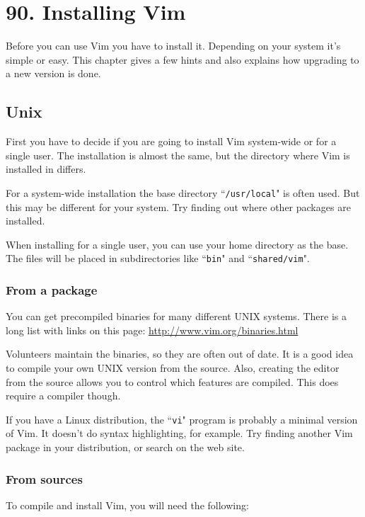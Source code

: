 \section{90. Installing Vim}
\label{Installing Vim}
\label{install}
Before you can use Vim you have to install it.
Depending on your system it's simple or easy.
This chapter gives a few hints and also explains how upgrading to a new version is done.
\localtableofcontents
\subsection{Unix}
First you have to decide if you are going to install Vim system-wide or for a single user.
The installation is almost the same, but the directory where Vim is installed in differs.

For a system-wide installation the base directory ``\texttt{/usr/local}" is often used.
But this may be different for your system.
Try finding out where other packages are installed.

When installing for a single user, you can use your home directory as the base.
The files will be placed in subdirectories like ``\texttt{bin}" and ``\texttt{shared/vim}".

\subsubsection{From a package}
You can get precompiled binaries for many different UNIX systems.
There is a long list with links on this page: \url{http://www.vim.org/binaries.html}

Volunteers maintain the binaries, so they are often out of date.
It is a good idea to compile your own UNIX version from the source.
Also, creating the editor from the source allows you to control which features are compiled.
This does require a compiler though.

If you have a Linux distribution, the ``\texttt{vi}" program is probably a minimal version of Vim.
It doesn't do syntax highlighting, for example.
Try finding another Vim package in your distribution, or search on the web site.

\subsubsection{From sources}
To compile and install Vim, you will need the following:

